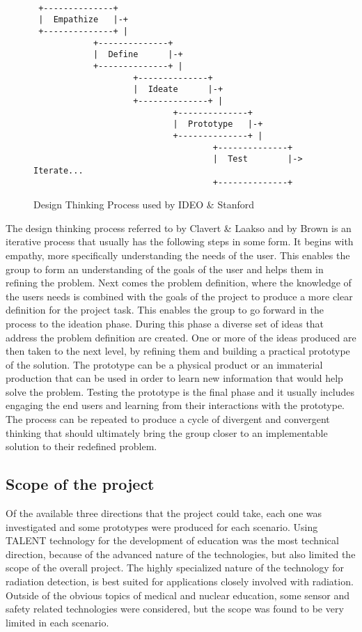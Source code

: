 \documentclass[english,12pt,a4paper,dvips]{article}
\begin{document}
\begin{figure}
\begin{verbatim}
 
 +--------------+
 |  Empathize   |-+
 +--------------+ |
            +--------------+
            |  Define      |-+
            +--------------+ |
                    +--------------+
                    |  Ideate      |-+
                    +--------------+ |
                            +--------------+
                            |  Prototype   |-+
                            +--------------+ |
                                    +--------------+
                                    |  Test        |-> Iterate...
                                    +--------------+
\end{verbatim}
\caption{Design Thinking Process used by IDEO & Stanford}
\label{fig:dt-process}
\end{figure}

The design thinking process referred to by Clavert & Laakso \cite{Clavert} and by Brown \cite{Brown} is an iterative process that usually has the following steps in some form. It begins with empathy, more specifically understanding the needs of the user. This enables the group to form an understanding of the goals of the user and helps them in refining the problem. Next comes the problem definition, where the knowledge of the users needs is combined with the goals of the project to produce a more clear definition for the project task. This enables the group to go forward in the process to the ideation phase. During this phase a diverse set of ideas that address the problem definition are created. One or more of the ideas produced are then taken to the next level, by refining them and building a practical prototype of the solution. The prototype can be a physical product or an immaterial production that can be used in order to learn new information that would help solve the problem. Testing the prototype is the final phase and it usually includes engaging the end users and learning from their interactions with the prototype. \cite{Clavert} \cite{Brown} The process can be repeated to produce a cycle of divergent and convergent thinking that should ultimately bring the group closer to an implementable solution to their redefined problem.

\subsection{Scope of the project}

Of the available three directions that the project could take, each one was investigated and some prototypes were produced for each scenario. Using TALENT technology for the development of education was the most technical direction, because of the advanced nature of the technologies, but also limited the scope of the overall project. The highly specialized nature of the technology for radiation detection, is best suited for applications closely involved with radiation. Outside of the obvious topics of medical and nuclear education, some sensor and safety related technologies were considered, but the scope was found to be very limited in each scenario.
\end{document}
